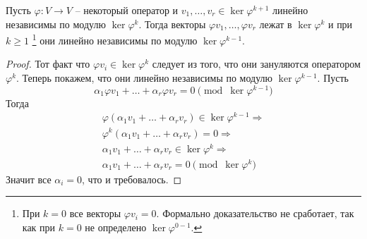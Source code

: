 \begin{claim}
\label{claim::LinIndepModKer}
Пусть $\varphi\colon V\to V$ -- некоторый оператор и $v_1,\ldots,v_r\in \ker \varphi^{k+1}$ линейно независимы по модулю $\ker \varphi^k$.
Тогда векторы $\varphi v_1,\ldots,\varphi v_r$ лежат в $\ker \varphi^k$ и при $k \geqslant 1$%
\footnote{При $k = 0$ все векторы $\varphi v_i = 0$.
Формально доказательство не сработает, так как при $k = 0$ не определено $\ker \varphi^{0 - 1}$.}
они линейно независимы по модулю $\ker \varphi^{k-1}$.
\end{claim}
\begin{proof}
Тот факт что $\varphi v_i\in \ker \varphi^{k}$ следует из того, что они зануляются оператором $\varphi^k$.
Теперь покажем, что они линейно независимы по модулю $\ker \varphi^{k-1}$.
Пусть 
\[
\alpha_1 \varphi v_1 + \ldots + \alpha_r \varphi v_r = 0 \pmod{\ker \varphi^{k-1}}
\]
Тогда
\begin{gather*}
\varphi(\alpha_1 v_1 + \ldots + \alpha_r v_r)\in \ker \varphi^{k-1}\Rightarrow\\
\varphi^k(\alpha_1 v_1 + \ldots + \alpha_r v_r) = 0\Rightarrow\\
\alpha_1v_1 +\ldots + \alpha_r v_r \in \ker\varphi^k\Rightarrow\\
\alpha_1 v_1 + \ldots + \alpha_r v_r = 0 \pmod{\ker \varphi^k}
\end{gather*}
Значит все $\alpha_i = 0$, что и требовалось.
\end{proof}

